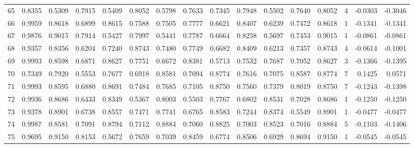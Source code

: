 \begin{tabular}{lrrrrrrrrrrrrrrr}
65  &      0.8355 &  0.5309 &  0.7915 &  0.5409 &  0.8052 &  0.5798 &  0.7633 &  0.7345 &  0.7948 &  0.5502 &   0.7640 &     0.8052 &      4 &                   -0.0303 &                    -0.3046 \\
66  &      0.9959 &  0.8618 &  0.6899 &  0.8615 &  0.7588 &  0.7505 &  0.7777 &  0.6621 &  0.8407 &  0.6239 &   0.7472 &     0.8618 &      1 &                   -0.1341 &                    -0.1341 \\
67  &      0.9876 &  0.9015 &  0.7914 &  0.5427 &  0.7997 &  0.5441 &  0.7787 &  0.6664 &  0.8258 &  0.5697 &   0.7453 &     0.9015 &      1 &                   -0.0861 &                    -0.0861 \\
68  &      0.9357 &  0.8356 &  0.6204 &  0.7240 &  0.8743 &  0.7480 &  0.7749 &  0.6682 &  0.8409 &  0.6213 &   0.7357 &     0.8743 &      4 &                   -0.0614 &                    -0.1001 \\
69  &      0.9993 &  0.8598 &  0.6871 &  0.8627 &  0.7751 &  0.6672 &  0.8381 &  0.5713 &  0.7532 &  0.7687 &   0.7052 &     0.8627 &      3 &                   -0.1366 &                    -0.1395 \\
70  &      0.7349 &  0.7920 &  0.5553 &  0.7677 &  0.6918 &  0.8581 &  0.7094 &  0.8774 &  0.7616 &  0.7075 &   0.8587 &     0.8774 &      7 &                    0.1425 &                     0.0571 \\
71  &      0.9993 &  0.8595 &  0.6880 &  0.8691 &  0.7484 &  0.7685 &  0.7105 &  0.8750 &  0.7560 &  0.7379 &   0.8019 &     0.8750 &      7 &                   -0.1243 &                    -0.1398 \\
72  &      0.9936 &  0.8686 &  0.6433 &  0.8349 &  0.5367 &  0.8003 &  0.5503 &  0.7767 &  0.6802 &  0.8531 &   0.7028 &     0.8686 &      1 &                   -0.1250 &                    -0.1250 \\
73  &      0.9378 &  0.8901 &  0.6738 &  0.8557 &  0.7471 &  0.7741 &  0.6765 &  0.8583 &  0.7244 &  0.8374 &   0.5549 &     0.8901 &      1 &                   -0.0477 &                    -0.0477 \\
74  &      0.9987 &  0.8581 &  0.7091 &  0.8794 &  0.7112 &  0.8884 &  0.7060 &  0.8825 &  0.7003 &  0.8523 &   0.7016 &     0.8884 &      5 &                   -0.1103 &                    -0.1406 \\
75  &      0.9695 &  0.9150 &  0.8153 &  0.5672 &  0.7659 &  0.7039 &  0.8459 &  0.6774 &  0.8506 &  0.6929 &   0.8694 &     0.9150 &      1 &                   -0.0545 &                    -0.0545 \\

\end{tabular}
